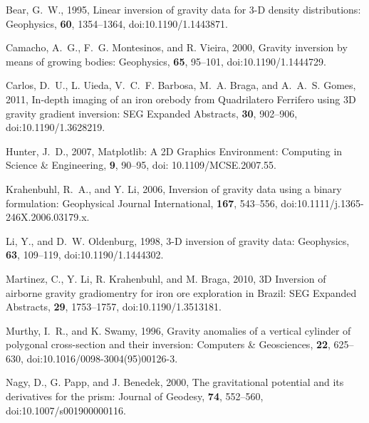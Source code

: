 \documentclass{segabs}
\begin{document}
%
\onecolumn{}

\begin{thebibliography}{}
\itemsep0pt

Bear, G.~W.,  1995, {Linear inversion of gravity data for 3-D density
  distributions}: Geophysics, {\bf 60}, 1354--1364, doi:10.1190/1.1443871.

Camacho, A.~G., F.~G. Montesinos, and R. Vieira,  2000, {Gravity inversion by
  means of growing bodies}: Geophysics, {\bf 65}, 95--101,
  doi:10.1190/1.1444729.

Carlos, D.~U., L. Uieda, V.~C.~F. Barbosa, M.~A. Braga, and A.~A.~S. Gomes,
  2011, {In-depth imaging of an iron orebody from Quadrilatero Ferrifero using
  3D gravity gradient inversion}: SEG Expanded Abstracts, {\bf 30}, 902--906,
  doi:10.1190/1.3628219.

Hunter, J.~D.,  2007, {Matplotlib: A 2D Graphics Environment}: Computing in
  Science \& Engineering, {\bf 9}, 90--95, doi: 10.1109/MCSE.2007.55.

Krahenbuhl, R.~A., and Y. Li,  2006, {Inversion of gravity data using a binary
  formulation}: Geophysical Journal International, {\bf 167}, 543--556,
  doi:10.1111/j.1365-246X.2006.03179.x.

Li, Y., and D.~W. Oldenburg,  1998, {3-D inversion of gravity data}:
  Geophysics, {\bf 63}, 109--119, doi:10.1190/1.1444302.

Martinez, C., Y. Li, R. Krahenbuhl, and M. Braga,  2010, {3D Inversion of
  airborne gravity gradiomentry for iron ore exploration in Brazil}: SEG
  Expanded Abstracts, {\bf 29}, 1753--1757, doi:10.1190/1.3513181.

Murthy, I.~R., and K. Swamy,  1996, {Gravity anomalies of a vertical cylinder
  of polygonal cross-section and their inversion}: Computers \& Geosciences,
  {\bf 22}, 625--630, doi:10.1016/0098-3004(95)00126-3.

Nagy, D., G. Papp, and J. Benedek,  2000, {The gravitational potential and its
  derivatives for the prism}: Journal of Geodesy, {\bf 74}, 552--560,
  doi:10.1007/s001900000116.


\end{thebibliography}
\end{document}
